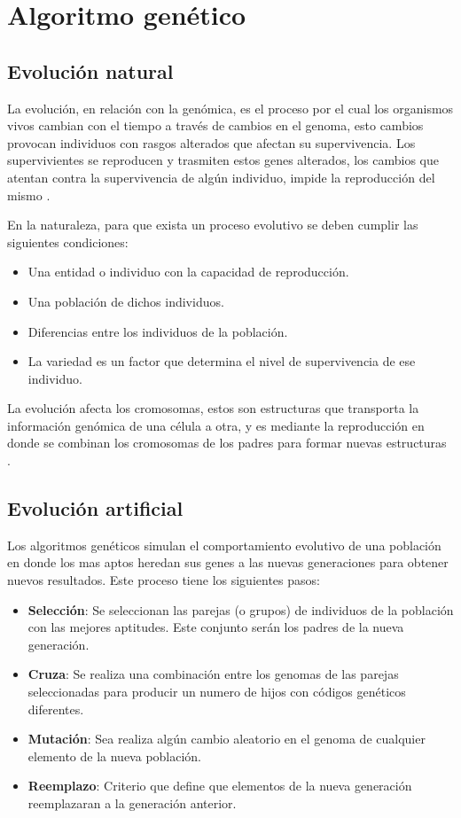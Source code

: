 \chapter{Algoritmo genético}

\section{Evolución natural}

La evolución, en relación con la genómica, es el proceso por el cual los organismos vivos cambian con el tiempo a través de cambios en el genoma, esto cambios provocan individuos con rasgos alterados que afectan su supervivencia. Los supervivientes se reproducen y trasmiten estos genes alterados, los cambios que atentan contra la supervivencia de algún individuo, impide la reproducción del mismo \cite{evolucion}.

En la naturaleza, para que exista un proceso evolutivo se deben cumplir las siguientes condiciones:
\begin{itemize}
	\item Una entidad o individuo con la capacidad de reproducción.
	\item Una población de dichos individuos.
	\item Diferencias entre los individuos de la población.
	\item La variedad es un factor que determina el nivel de supervivencia de ese individuo.
\end{itemize}

La evolución afecta los cromosomas, estos son estructuras que transporta la información genómica de una célula a otra, y es mediante la reproducción en donde se combinan los cromosomas de los padres para formar nuevas estructuras \cite{evolucion_2, cromosoma}.

\section{Evolución artificial}

Los algoritmos genéticos simulan el comportamiento evolutivo de una población en donde los mas aptos heredan sus genes a las nuevas generaciones para obtener nuevos resultados.  Este proceso tiene los siguientes pasos:
\begin{itemize}
	\item \textbf{Selección}: Se seleccionan las parejas (o grupos) de individuos de la población con las mejores aptitudes. Este conjunto serán los padres de la nueva generación.
	
	\item \textbf{Cruza}: Se realiza una combinación entre los genomas de las parejas seleccionadas para producir un numero de hijos con códigos genéticos diferentes.
	
	\item \textbf{Mutación}: Sea realiza algún cambio aleatorio en el genoma de cualquier elemento de la nueva población.
	
	\item \textbf{Reemplazo}: Criterio que define que elementos de la nueva generación reemplazaran a la generación anterior.
\end{itemize}

